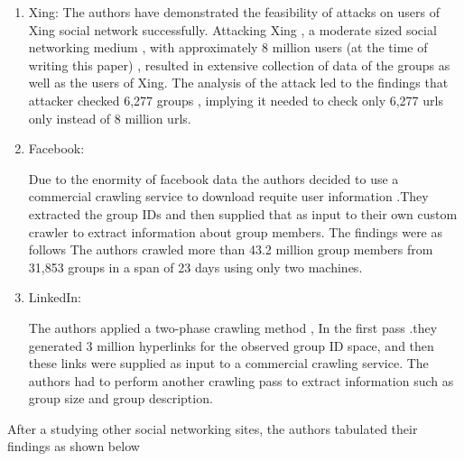 \documentclass{article}
\begin{document}
\begin{enumerate}

\item  Xing: 
The authors have demonstrated the feasibility of attacks on users of Xing social network successfully. Attacking  Xing , a moderate sized social networking medium , with approximately 8 million users (at the time of writing this paper) , resulted in extensive collection of data of the groups as well as the users of Xing. The analysis of the attack led to the findings that attacker checked 6,277 groups , implying it needed to check only 6,277 urls only instead of 8 million urls.

\item Facebook:

 Due to the enormity of facebook data the authors  decided to use a commercial crawling service to download requite user information .They extracted the group IDs and then supplied that as input to their own custom crawler to extract information about group members. The findings were as follows
The authors crawled more than  43.2 million group members from 31,853 groups in a span of 23 days using only two machines. 
\\

\item LinkedIn: 

The authors applied a  two-phase crawling method , In the first pass .they  generated 3 million hyperlinks for the observed group ID space, and then these links were supplied as input to a commercial crawling service. The authors had to perform another  crawling pass to extract information such as  group size and group description.

\end{enumerate}

After a studying other social networking sites, the authors tabulated their findings as shown below
\end{document}
